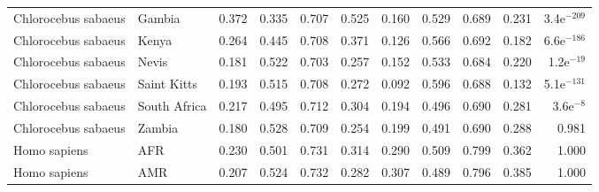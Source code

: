 \begin{center}
\begin{adjustbox}{width = 1\textwidth}
\begin{tabular}{llrrrrrrrrr}
 Chlorocebus sabaeus &                    Gambia &                              0.372 &                               0.335 &                 0.707 &                 0.525 &                              0.160 &                               0.529 &                 0.689 &                 0.231 & 3.4e$^{-209}$ \\
 Chlorocebus sabaeus &                     Kenya &                              0.264 &                               0.445 &                 0.708 &                 0.371 &                              0.126 &                               0.566 &                 0.692 &                 0.182 & 6.6e$^{-186}$ \\
 Chlorocebus sabaeus &                     Nevis &                              0.181 &                               0.522 &                 0.703 &                 0.257 &                              0.152 &                               0.533 &                 0.684 &                 0.220 &  1.2e$^{-19}$ \\
 Chlorocebus sabaeus &               Saint Kitts &                              0.193 &                               0.515 &                 0.708 &                 0.272 &                              0.092 &                               0.596 &                 0.688 &                 0.132 & 5.1e$^{-131}$ \\
 Chlorocebus sabaeus &              South Africa &                              0.217 &                               0.495 &                 0.712 &                 0.304 &                              0.194 &                               0.496 &                 0.690 &                 0.281 &   3.6e$^{-8}$ \\
 Chlorocebus sabaeus &                    Zambia &                              0.180 &                               0.528 &                 0.709 &                 0.254 &                              0.199 &                               0.491 &                 0.690 &                 0.288 &         0.981 \\
        Homo sapiens &                       AFR &                              0.230 &                               0.501 &                 0.731 &                 0.314 &                              0.290 &                               0.509 &                 0.799 &                 0.362 &         1.000 \\
        Homo sapiens &                       AMR &                              0.207 &                               0.524 &                 0.732 &                 0.282 &                              0.307 &                               0.489 &                 0.796 &                 0.385 &         1.000 \\

\end{tabular}
\end{adjustbox}
\end{center}
